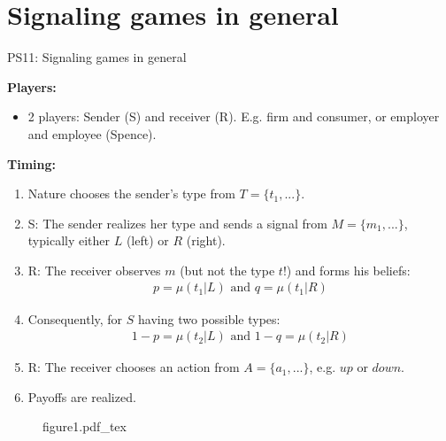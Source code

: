 \section{Signaling games in general}

\begin{frame}{PS11: Signaling games in general}
    \begin{multicols}{2}
      \textbf{Players:}\vspace{-4pt}
      \begin{itemize}
        \item 2 players: Sender (S) and receiver (R). E.g. firm and consumer, or employer and employee (Spence).
      \end{itemize}\vspace{-4pt}
      \textbf{Timing:}\vspace{-4pt}
      \begin{enumerate}
        \item Nature chooses the sender's type from $T=\{t_1,...\}$.
        \item S: The sender realizes her type and sends a signal from $M=\{m_1,...\}$, typically either $L$ (left) or $R$ (right).
        \item R: The receiver observes $m$ (but not the type $t$!) and forms his beliefs:\vspace{-4pt}
        \begin{align*}
          p=\mu(t_1|L)\text{ and }q=\mu(t_1|R)
        \end{align*}
        \item[] \vspace{-4pt} Consequently, for $S$ having two possible types:\vspace{-4pt}
        \begin{align*}
          1-p=\mu(t_2|L)\text{ and }1-q=\mu(t_2|R)
        \end{align*}
        \item \vspace{-4pt} R: The receiver chooses an action from $A=\{a_1,...\}$, e.g. $up$ or $down$.
        \item Payoffs are realized.
      \end{enumerate}
      \vfill\null\columnbreak
      \begin{figure}[!h]
        \center
        \def\svgwidth{\columnwidth}
        {figure1.pdf_tex}
      \end{figure}
      \vfill\null
    \end{multicols}
\end{frame}

